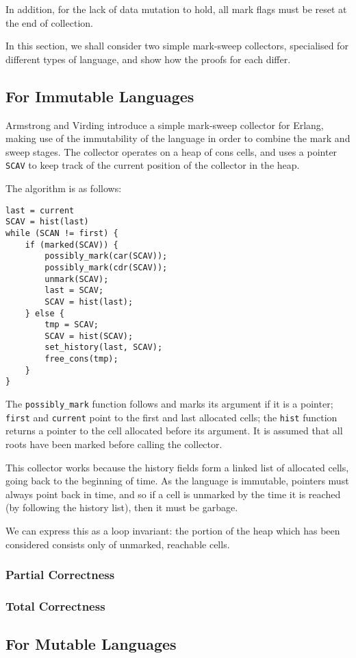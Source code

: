 In addition, for the lack of data mutation to hold, all mark flags
must be reset at the end of collection.

In this section, we shall consider two simple mark-sweep collectors,
specialised for different types of language, and show how the proofs
for each differ.

\subsection{For Immutable Languages}

Armstrong and Virding\cite{Armstrong95} introduce a simple
\gls{mark-sweep} \gls{collector} for Erlang, making use of the
immutability of the language in order to combine the mark and sweep
stages. The \gls{collector} operates on a \gls{heap} of cons cells,
and uses a \gls{pointer} \texttt{SCAV} to keep track of the current
position of the \gls{collector} in the heap.

The algorithm is as follows:

\begin{lstlisting}
last = current
SCAV = hist(last)
while (SCAN != first) {
    if (marked(SCAV)) {
        possibly_mark(car(SCAV));
        possibly_mark(cdr(SCAV));
        unmark(SCAV);
        last = SCAV;
        SCAV = hist(last);
    } else {
        tmp = SCAV;
        SCAV = hist(SCAV);
        set_history(last, SCAV);
        free_cons(tmp);
    }
}
\end{lstlisting}

The \texttt{possibly\_mark} function follows and marks its argument if
it is a pointer; \texttt{first} and \texttt{current} point to the
first and last allocated \glspl{cell}; the \texttt{hist} function
returns a \gls{pointer} to the \gls{cell} allocated before its
argument. It is assumed that all roots have been marked before calling
the collector.

This \gls{collector} works because the history fields form a linked
list of allocated cells, going back to the beginning of time. As the
language is immutable, pointers must always point back in time, and so
if a cell is unmarked by the time it is reached (by following the
history list), then it must be garbage.

We can express this as a loop invariant: the portion of the heap which
has been considered consists only of unmarked, reachable cells.

\subsubsection{Partial Correctness}


\subsubsection{Total Correctness}


\subsection{For Mutable Languages}

